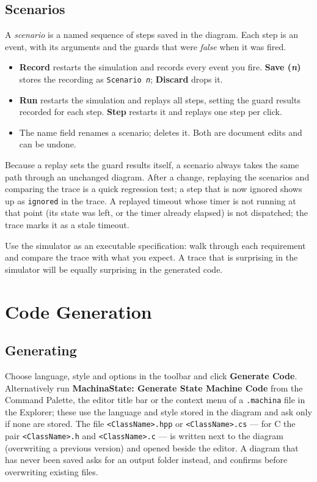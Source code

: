 \documentclass[11pt,a4paper,openany]{report}
\newcommand{\ui}[1]{\textsf{\textbf{#1}}}
\newcommand{\code}[1]{\texttt{#1}}
\begin{document}
\section{Scenarios}
\label{sec:scenarios}
A \emph{scenario} is a named sequence of steps saved in the diagram. Each step is an event, with its
arguments and the guards that were \emph{false} when it was fired.
\begin{itemize}[itemsep=1pt]
  \item \ui{Record} restarts the simulation and records every event you fire. \ui{Save (\textit{n})}
        stores the recording as \code{Scenario \textit{n}}; \ui{Discard} drops it.
  \item \ui{Run} restarts the simulation and replays all steps, setting the guard results recorded for
        each step. \ui{Step} restarts it and replays one step per click.
  \item The name field renames a scenario; \ui{\texttimes} deletes it. Both are document edits and can
        be undone.
\end{itemize}
Because a replay sets the guard results itself, a scenario always takes the same path through an
unchanged diagram. After a change, replaying the scenarios and comparing the trace is a quick
regression test; a step that is now ignored shows up as \code{ignored} in the trace. A replayed
timeout whose timer is not running at that point (its state was left, or the timer already elapsed) is
not dispatched; the trace marks it as a stale timeout.

\begin{tip}
Use the simulator as an executable specification: walk through each requirement and compare the
trace with what you expect. A trace that is surprising in the simulator will be equally surprising in
the generated code.
\end{tip}

\chapter{Code Generation}
\label{ch:codegen}

\section{Generating}
Choose language, style and options in the toolbar and click \ui{Generate Code}. Alternatively run
\ui{MachinaState: Generate State Machine Code} from the Command Palette, the editor title bar or the
context menu of a \code{.machina} file in the Explorer; these use the language and style stored in
the diagram and ask only if none are stored. The file \code{<ClassName>.hpp} or \code{<ClassName>.cs}
--- for C the pair \code{<ClassName>.h} and \code{<ClassName>.c} --- is written next to the diagram
(overwriting a previous version) and opened beside the editor. A diagram that has never been saved asks
for an output folder instead, and confirms before overwriting existing files.
\end{document}
